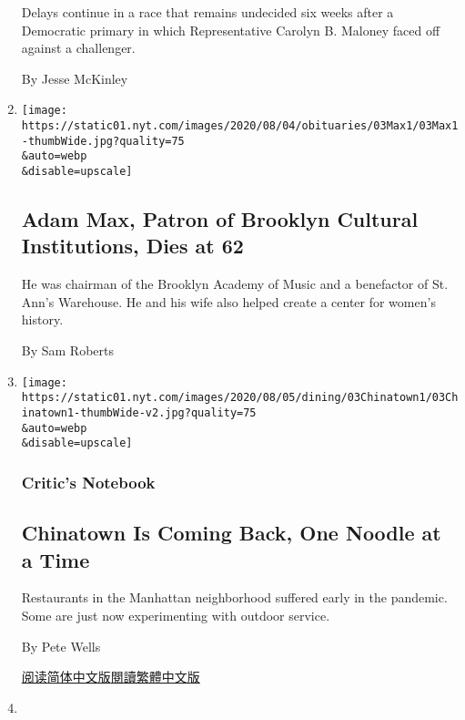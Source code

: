 \begin{enumerate}
  Delays continue in a race that remains undecided six weeks after a
  Democratic primary in which Representative Carolyn B. Maloney faced
  off against a challenger.

  By Jesse McKinley
\item
  \href{/2020/08/03/arts/adam-max-patron-of-brooklyn-cultural-institutions-dies-at-62.html}{}

  \texttt{[image: https://static01.nyt.com/images/2020/08/04/obituaries/03Max1/03Max1-thumbWide.jpg?quality=75\\\&auto=webp\\\&disable=upscale]}

  \hypertarget{adam-max-patron-of-brooklyn-cultural-institutions-dies-at-62}{%
  \subsection{Adam Max, Patron of Brooklyn Cultural Institutions, Dies
  at
  62}\label{adam-max-patron-of-brooklyn-cultural-institutions-dies-at-62}}

  He was chairman of the Brooklyn Academy of Music and a benefactor of
  St. Ann's Warehouse. He and his wife also helped create a center for
  women's history.

  By Sam Roberts
\item
  \href{/2020/08/03/dining/chinatown-outdoor-dining-coronavirus.html}{}

  \texttt{[image: https://static01.nyt.com/images/2020/08/05/dining/03Chinatown1/03Chinatown1-thumbWide-v2.jpg?quality=75\\\&auto=webp\\\&disable=upscale]}

  \hypertarget{critics-notebook}{%
  \subsubsection{Critic's Notebook}\label{critics-notebook}}

  \hypertarget{chinatown-is-coming-back-one-noodle-at-a-time}{%
  \subsection{Chinatown Is Coming Back, One Noodle at a
  Time}\label{chinatown-is-coming-back-one-noodle-at-a-time}}

  Restaurants in the Manhattan neighborhood suffered early in the
  pandemic. Some are just now experimenting with outdoor service.

  By Pete Wells

  \href{https://cn.nytimes.com/style/20200804/chinatown-outdoor-dining-coronavirus/}{阅读简体中文版}\href{https://cn.nytimes.com/style/20200804/chinatown-outdoor-dining-coronavirus/zh-hant/}{閱讀繁體中文版}
\item
  \href{/2020/08/03/nyregion/nyc-subway-coronavirus.html}{}


\end{enumerate}
